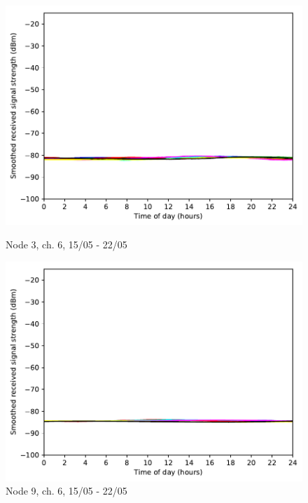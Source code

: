 \documentclass[a4paper, 11pt]{article}
\begin{document}
\begin{figure}[!h]
\begin{minipage}{0.47\textwidth}
    \centering
	\includegraphics[width=\textwidth]{images/2_4_GHz/cot-node3-student_2017-05-21_chan6_image}
    \caption{Node 3, ch. 6, 15/05 - 22/05} \label{node3-6}
\end{minipage}\hfill
\begin{minipage}{0.47\textwidth}
    \centering
	\includegraphics[width=\textwidth]{images/2_4_GHz/cot-node9-student_2017-05-21_chan6_image}
    \caption{Node 9, ch. 6, 15/05 - 22/05} \label{node9-6}
\end{minipage}\hfill
\end{figure}
\end{document}
